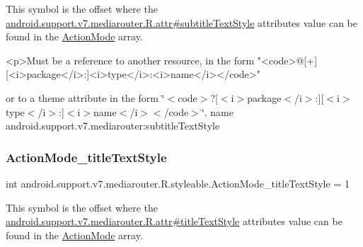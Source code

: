 This symbol is the offset where the \hyperlink{classandroid_1_1support_1_1v7_1_1mediarouter_1_1R_1_1attr_a44538ca09d79d732baf7e183450e704c}{android.\+support.\+v7.\+mediarouter.\+R.\+attr\#subtitle\+Text\+Style} attribute\textquotesingle{}s value can be found in the \hyperlink{classandroid_1_1support_1_1v7_1_1mediarouter_1_1R_1_1styleable_a4aa490e6088a98056876d4f9227193c8}{Action\+Mode} array.

\begin{DoxyVerb}      <p>Must be a reference to another resource, in the form "<code>@[+][<i>package</i>:]<i>type</i>:<i>name</i></code>"
\end{DoxyVerb}
 or to a theme attribute in the form \char`\"{}$<$code$>$?\mbox{[}$<$i$>$package$<$/i$>$\+:\mbox{]}\mbox{[}$<$i$>$type$<$/i$>$\+:\mbox{]}$<$i$>$name$<$/i$>$$<$/code$>$\char`\"{}.  name android.\+support.\+v7.\+mediarouter\+:subtitle\+Text\+Style \mbox{\label{classandroid_1_1support_1_1v7_1_1mediarouter_1_1R_1_1styleable_a448e15fac45ca973519260e405b17757}} 
\subsubsection{\texorpdfstring{Action\+Mode\+\_\+title\+Text\+Style}{ActionMode\_titleTextStyle}}
{\footnotesize\ttfamily int android.\+support.\+v7.\+mediarouter.\+R.\+styleable.\+Action\+Mode\+\_\+title\+Text\+Style = 1\hspace{0.3cm}{\ttfamily [static]}}

This symbol is the offset where the \hyperlink{classandroid_1_1support_1_1v7_1_1mediarouter_1_1R_1_1attr_af0515fea4fdf16c1b914b839db3e8168}{android.\+support.\+v7.\+mediarouter.\+R.\+attr\#title\+Text\+Style} attribute\textquotesingle{}s value can be found in the \hyperlink{classandroid_1_1support_1_1v7_1_1mediarouter_1_1R_1_1styleable_a4aa490e6088a98056876d4f9227193c8}{Action\+Mode} array.

